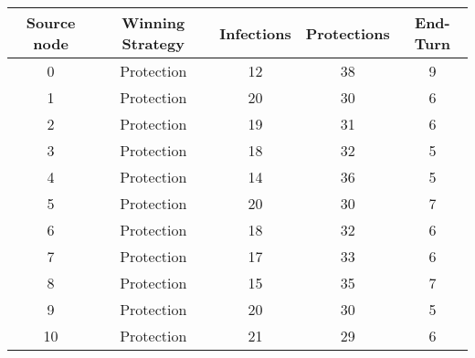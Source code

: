 \documentclass[results.tex]{subfiles}
\begin{document}
    \begin{center}
        \begin{tabular}{| c || c | c | c | c |}
            \hline
            {\bfseries Source node} & {\bfseries Winning Strategy} & {\bfseries Infections} & {\bfseries Protections}
            & {\bfseries End-Turn}
            \\  %
            \hline\hline
            0                       & Protection                   & 12                     & 38                      & 9                    \\
            \hline
            1                       & Protection                   & 20                     & 30                      & 6                    \\
            \hline
            2                       & Protection                   & 19                     & 31                      & 6                    \\
            \hline
            3                       & Protection                   & 18                     & 32                      & 5                    \\
            \hline
            4                       & Protection                   & 14                     & 36                      & 5                    \\
            \hline
            5                       & Protection                   & 20                     & 30                      & 7                    \\
            \hline
            6                       & Protection                   & 18                     & 32                      & 6                    \\
            \hline
            7                       & Protection                   & 17                     & 33                      & 6                    \\
            \hline
            8                       & Protection                   & 15                     & 35                      & 7                    \\
            \hline
            9                       & Protection                   & 20                     & 30                      & 5                    \\
            \hline
            10                      & Protection                   & 21                     & 29                      & 6                    \\

\end{tabular}
\end{center}
\end{document}

